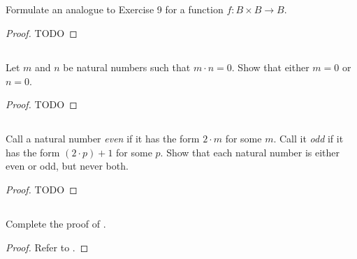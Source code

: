 \documentclass{report}
\begin{document}
\subsection{}%

Formulate an analogue to Exercise 9 for a function
  $f \colon B \times B \rightarrow B$.

\begin{proof}

  TODO

\end{proof}

\subsection{}%

Let $m$ and $n$ be natural numbers such that $m \cdot n = 0$.
Show that either $m = 0$ or $n = 0$.

\begin{proof}

  TODO

\end{proof}

\subsection{}%

Call a natural number \textit{even} if it has the form $2 \cdot m$ for some $m$.
Call it \textit{odd} if it has the form $(2 \cdot p) + 1$ for some $p$.
Show that each natural number is either even or odd, but never both.

\begin{proof}

  TODO

\end{proof}

\subsection{}%

Complete the proof of .

\begin{proof}

  Refer to .

\end{proof}
\end{document}
